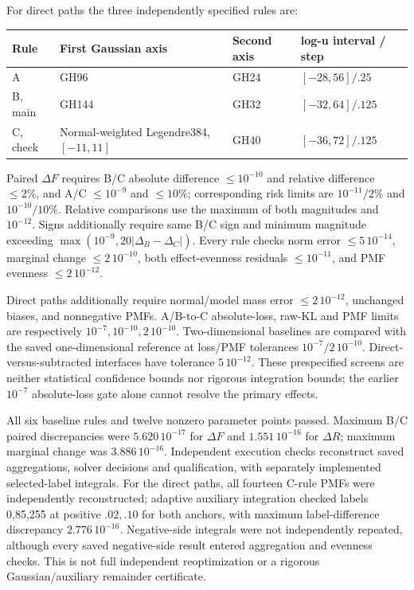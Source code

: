 \documentclass{article}
\begin{document}
For direct paths the three independently specified rules are:

\begin{longtable}[]{@{}llll@{}}
\toprule\noalign{}
Rule & First Gaussian axis & Second axis & log-u interval / step \\
\midrule\noalign{}
\endhead
\bottomrule\noalign{}
\endlastfoot
A & GH96 & GH24 & \([-28,56]/.25\) \\
B, main & GH144 & GH32 & \([-32,64]/.125\) \\
C, check & Normal-weighted Legendre384, \([-11,11]\) & GH40 &
\([-36,72]/.125\) \\
\end{longtable}

Paired \(\Delta F\) requires B/C absolute difference \(\le10^{-10}\) and
relative difference \(\le2\%\), and A/C \(\le10^{-9}\) and \(\le10\%\);
corresponding risk limits are \(10^{-11}/2\%\) and \(10^{-10}/10\%\).
Relative comparisons use the maximum of both magnitudes and
\(10^{-12}\). Signs additionally require same B/C sign and minimum
magnitude exceeding \(\max(10^{-9},20|\Delta_B-\Delta_C|)\). Every rule
checks norm error \(\le5\,10^{-14}\), marginal change
\(\le2\,10^{-10}\), both effect-evenness residuals \(\le10^{-11}\), and
PMF evenness \(\le2\,10^{-12}\).

Direct paths additionally require normal/model mass error
\(\le2\,10^{-12}\), unchanged biases, and nonnegative PMFs. A/B-to-C
absolute-loss, raw-KL and PMF limits are respectively
\(10^{-7},10^{-10},2\,10^{-10}\). Two-dimensional baselines are compared
with the saved one-dimensional reference at loss/PMF tolerances
\(10^{-7}/2\,10^{-10}\). Direct-versus-subtracted interfaces have
tolerance \(5\,10^{-12}\). These prespecified screens are neither
statistical confidence bounds nor rigorous integration bounds; the
earlier \(10^{-7}\) absolute-loss gate alone cannot resolve the primary
effects.

All six baseline rules and twelve nonzero parameter points passed.
Maximum B/C paired discrepancies were \(5.620\,10^{-17}\) for
\(\Delta F\) and \(1.551\,10^{-16}\) for \(\Delta R\); maximum marginal
change was \(3.886\,10^{-16}\). Independent execution checks reconstruct
saved aggregations, solver decisions and qualification, with separately
implemented selected-label integrals. For the direct paths, all fourteen
C-rule PMFs were independently reconstructed; adaptive auxiliary
integration checked labels 0,85,255 at positive \(.02,.10\) for both
anchors, with maximum label-difference discrepancy \(2.776\,10^{-16}\).
Negative-side integrals were not independently repeated, although every
saved negative-side result entered aggregation and evenness checks. This
is not full independent reoptimization or a rigorous Gaussian/auxiliary
remainder certificate.
\end{document}

